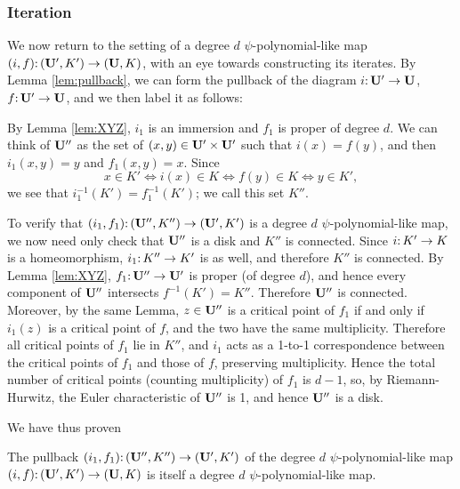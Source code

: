 \subsubsection{Iteration} \label{psiql:iterate-actual}
We now return to the setting of a degree $d$ $\psi$-polynomial-like map $(i, f)\mathpunct: (\mathbf U', K') \to (\mathbf U, K)$,
with an eye towards constructing its iterates.
By Lemma \ref{lem:pullback},
we can form the pullback of the diagram $i\mathpunct: \mathbf U' \to \mathbf U$, $f\mathpunct: \mathbf U' \to \mathbf U$,
and we then label it as follows:

\begin{center}
\end{center}

By Lemma \ref{lem:XYZ},
$i_1$ is an immersion and $f_1$ is proper of degree $d$.
We can think of $\mathbf U''$ as the set of $(x, y) \in \mathbf U' \times \mathbf U'$ such that $i(x) = f(y)$,
and then $i_1(x, y) = y$ and $f_1(x, y) = x$. 
Since 
$$x \in K' \iff i(x) \in K \iff f(y) \in K \iff y \in K',$$
we see that $i_1^{-1}(K') = f_1^{-1}(K')$; we call this set $K''$. 

To verify that $(i_1, f_1)\mathpunct: (\mathbf U'', K'') \to (\mathbf U', K')$ is a degree $d$ $\psi$-polynomial-like map,
we now need only check that $\mathbf U''$ is a disk and $K''$ is connected. 
Since $i\mathpunct: K' \to K$ is a homeomorphism,
$i_1\mathpunct: K'' \to K'$ is as well, and therefore $K''$ is connected.
By Lemma \ref{lem:XYZ},
$f_1\mathpunct: \mathbf U''\to \mathbf U'$ is proper (of degree $d$),
and hence every component of $\mathbf U''$ intersects $f^{-1}(K') = K''$. 
Therefore $\mathbf U''$ is connected.
Moreover,
by the same Lemma,
$z \in \mathbf U''$ is a critical point of $f_1$ if and only if $i_1(z)$ is a critical point of $f$, 
and the two have the same multiplicity.
Therefore all critical points of $f_1$ lie in $K''$,
and $i_1$ acts as a 1-to-1 correspondence between the critical points of $f_1$ and those of $f$, preserving multiplicity.
Hence the total number of critical points
(counting multiplicity)
of $f_1$ is $d-1$,
so,
by Riemann-Hurwitz,
the Euler characteristic of $\mathbf U''$ is 1,
and hence $\mathbf U''$ is a disk. 

We have thus proven
\begin{lemma} \label{lem:pullback-ps-plm}
The pullback $(i_1, f_1)\mathpunct: (\mathbf U'', K'') \to (\mathbf U', K')$ 
of the degree $d$ $\psi$-polynomial-like map $(i, f)\mathpunct: (\mathbf U', K') \to (\mathbf U, K)$ 
is itself a degree $d$  $\psi$-polynomial-like map.
\end{lemma}


